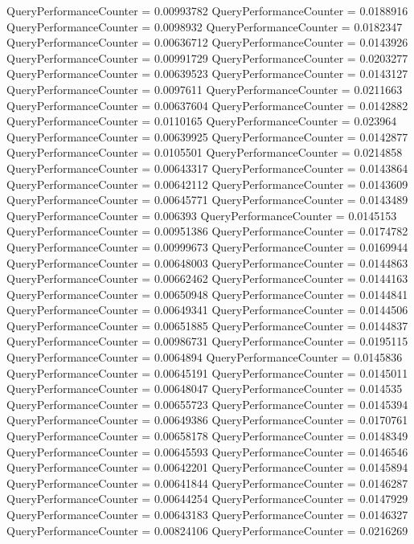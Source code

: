 \documentclass[9pt]{article}
\theoremstyle{plain}
\theoremstyle{definition}
\theoremstyle{remark}
\numberwithin{equation}{section}
\begin{document}
QueryPerformanceCounter  =  0.00993782
QueryPerformanceCounter  =  0.0188916
QueryPerformanceCounter  =  0.0098932
QueryPerformanceCounter  =  0.0182347
QueryPerformanceCounter  =  0.00636712
QueryPerformanceCounter  =  0.0143926
QueryPerformanceCounter  =  0.00991729
QueryPerformanceCounter  =  0.0203277
QueryPerformanceCounter  =  0.00639523
QueryPerformanceCounter  =  0.0143127
QueryPerformanceCounter  =  0.0097611
QueryPerformanceCounter  =  0.0211663
QueryPerformanceCounter  =  0.00637604
QueryPerformanceCounter  =  0.0142882
QueryPerformanceCounter  =  0.0110165
QueryPerformanceCounter  =  0.023964
QueryPerformanceCounter  =  0.00639925
QueryPerformanceCounter  =  0.0142877
QueryPerformanceCounter  =  0.0105501
QueryPerformanceCounter  =  0.0214858
QueryPerformanceCounter  =  0.00643317
QueryPerformanceCounter  =  0.0143864
QueryPerformanceCounter  =  0.00642112
QueryPerformanceCounter  =  0.0143609
QueryPerformanceCounter  =  0.00645771
QueryPerformanceCounter  =  0.0143489
QueryPerformanceCounter  =  0.006393
QueryPerformanceCounter  =  0.0145153
QueryPerformanceCounter  =  0.00951386
QueryPerformanceCounter  =  0.0174782
QueryPerformanceCounter  =  0.00999673
QueryPerformanceCounter  =  0.0169944
QueryPerformanceCounter  =  0.00648003
QueryPerformanceCounter  =  0.0144863
QueryPerformanceCounter  =  0.00662462
QueryPerformanceCounter  =  0.0144163
QueryPerformanceCounter  =  0.00650948
QueryPerformanceCounter  =  0.0144841
QueryPerformanceCounter  =  0.00649341
QueryPerformanceCounter  =  0.0144506
QueryPerformanceCounter  =  0.00651885
QueryPerformanceCounter  =  0.0144837
QueryPerformanceCounter  =  0.00986731
QueryPerformanceCounter  =  0.0195115
QueryPerformanceCounter  =  0.0064894
QueryPerformanceCounter  =  0.0145836
QueryPerformanceCounter  =  0.00645191
QueryPerformanceCounter  =  0.0145011
QueryPerformanceCounter  =  0.00648047
QueryPerformanceCounter  =  0.014535
QueryPerformanceCounter  =  0.00655723
QueryPerformanceCounter  =  0.0145394
QueryPerformanceCounter  =  0.00649386
QueryPerformanceCounter  =  0.0170761
QueryPerformanceCounter  =  0.00658178
QueryPerformanceCounter  =  0.0148349
QueryPerformanceCounter  =  0.00645593
QueryPerformanceCounter  =  0.0146546
QueryPerformanceCounter  =  0.00642201
QueryPerformanceCounter  =  0.0145894
QueryPerformanceCounter  =  0.00641844
QueryPerformanceCounter  =  0.0146287
QueryPerformanceCounter  =  0.00644254
QueryPerformanceCounter  =  0.0147929
QueryPerformanceCounter  =  0.00643183
QueryPerformanceCounter  =  0.0146327
QueryPerformanceCounter  =  0.00824106
QueryPerformanceCounter  =  0.0216269
\end{document}
